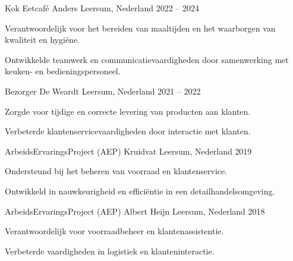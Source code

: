 

\begin{cventries}

  \cventry
    {Kok} %
    {Eetcafé Anders} %
    {Leersum, Nederland} %
    {2022 -- 2024} %
    {
      \begin{cvitems}
        \item {Verantwoordelijk voor het bereiden van maaltijden en het waarborgen van kwaliteit en hygiëne.}
        \item {Ontwikkelde teamwerk en communicatievaardigheden door samenwerking met keuken- en bedieningspersoneel.}
      \end{cvitems}
    }

  \cventry
    {Bezorger} %
    {De Weardt} %
    {Leersum, Nederland} %
    {2021 -- 2022} %
    {
      \begin{cvitems}
        \item {Zorgde voor tijdige en correcte levering van producten aan klanten.}
        \item {Verbeterde klantenservicevaardigheden door interactie met klanten.}
      \end{cvitems}
    }

  \cventry
    {ArbeidsErvaringsProject (AEP)} %
    {Kruidvat} %
    {Leersum, Nederland} %
    {2019} %
    {
      \begin{cvitems}
        \item {Ondersteund bij het beheren van voorraad en klantenservice.}
        \item {Ontwikkeld in nauwkeurigheid en efficiëntie in een detailhandelsomgeving.}
      \end{cvitems}
    }

  \cventry
    {ArbeidsErvaringsProject (AEP)} %
    {Albert Heijn} %
    {Leersum, Nederland} %
    {2018} %
    {
      \begin{cvitems}
        \item {Verantwoordelijk voor voorraadbeheer en klantenassistentie.}
        \item {Verbeterde vaardigheden in logistiek en klanteninteractie.}
      \end{cvitems}
    }


\end{cventries}
